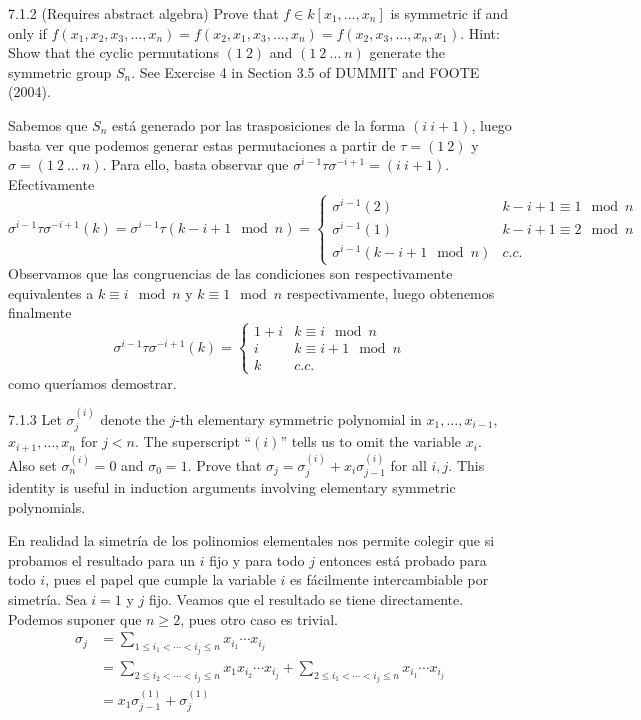 \documentclass[twoside]{article}
\begin{document}
\begin{ejercicio}{7.1.2}
(Requires abstract algebra) Prove that $f ∈ k[x_1, \dots , x_n]$ is symmetric if and only if
$f (x_1, x_2, x_3, \dots , x_n) = f (x_2, x_1, x_3, \dots , x_n) = f (x_2, x_3, \dots, x_n, x_1)$. Hint: Show that the
cyclic permutations $(1\ 2)$ and $(1\ 2\ \dots \ n)$ generate the symmetric group $S_n$. See Exercise
4 in Section 3.5 of DUMMIT and FOOTE (2004).
\end{ejercicio}
\begin{solucion}
Sabemos que $S_n$ está generado por las trasposiciones de la forma $(i\ i+1)$, luego basta ver que podemos generar estas permutaciones a partir de $\tau=(1\ 2)$ y $\sigma=(1\ 2\ \dots \ n)$. Para ello, basta observar que $\sigma^{i-1}\tau\sigma^{-i+1}=(i\ i+1)$. Efectivamente
\[
\sigma^{i-1}\tau\sigma^{-i+1}(k)=\sigma^{i-1}\tau(k-i+1\mod n)=\begin{cases}
\sigma^{i-1}(2) & k-i+1\equiv 1\mod n\\
\sigma^{i-1}(1) & k-i+1\equiv 2\mod n\\
\sigma^{i-1}(k-i+1\mod n) & c.c.
\end{cases}
\]
Observamos que las congruencias de las condiciones son respectivamente equivalentes a $k\equiv i\mod n$ y $k\equiv 1\mod n$ respectivamente, luego obtenemos finalmente
\[
\sigma^{i-1}\tau\sigma^{-i+1}(k)=\begin{cases}
1+i & k\equiv i\mod n\\
i& k\equiv i+1\mod n\\
k & c.c.
\end{cases}
\]
como queríamos demostrar.
\end{solucion}	

\newpage

\begin{ejercicio}{7.1.3}
Let $σ^{(i)}_j$ denote the $j$-th elementary symmetric polynomial in $x_1,\dots, x_{i−1},$ $x_{i+1},\dots, x_n$
for $j < n$. The superscript “$(i)$” tells us to omit the variable $x_i$. Also set $σ^{(i)}_n = 0$ and
$σ_0 = 1$. Prove that $σ_j = σ^{(i)}_j + x_iσ^{(i)}_{j−1}$ for all $i, j$. This identity is useful in induction
arguments involving elementary symmetric polynomials.
\end{ejercicio}
\begin{solucion}
En realidad la simetría de los polinomios elementales nos permite colegir que si probamos el resultado para un $i$ fijo y para todo $j$ entonces está probado para todo $i$, pues el papel que cumple la variable $i$ es fácilmente intercambiable por simetría. Sea $i=1$ y $j$ fijo. Veamos que el resultado se tiene directamente. Podemos suponer que $n\geq 2$, pues otro caso es trivial.
\begin{align*}
\sigma_j &= \sum_{1\leq i_1<\cdots<i_j\leq n}x_{i_1}\cdots x_{i_j}\\
&= \sum_{2\leq i_2<\cdots <i_j\leq n}x_{1}x_{i_2}\cdots x_{i_j} + \sum_{2\leq i_1<\cdots<i_j\leq n}x_{i_1}\cdots x_{i_j} \\
& = x_1 \sigma_{j-1}^{(1)}+\sigma_j^{(1)}
\end{align*}
\end{solucion}
\newpage
\end{document}
